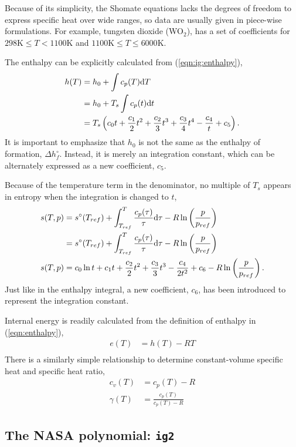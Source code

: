 Because of its simplicity, the Shomate equations lacks the degrees of freedom to express specific heat over wide ranges, so data are usually given in piece-wise formulations.  For example, tungsten dioxide (WO$_2$), has a set of coefficients for $298\mathrm{K} \le T < 1100\mathrm{K}$ and $1100\mathrm{K} \le T \le 6000\mathrm{K}$.

The enthalpy can be explicitly calculated from (\ref{eqn:ig:enthalpy}),
\begin{align}
h(T) &= h_0 + \int c_p(T) \mathrm{d} T \nonumber\\
 &= h_0 + T_s \int c_p(t) \mathrm{d} t \nonumber\\
 &= T_s \left(c_0 t + \frac{c_1}{2} t^2 + \frac{c_2}{3} t^3 + \frac{c_3}{4} t^4 - \frac{c_4}{t} + c_5 \right).
\end{align}
It is important to emphasize that $h_0$ is not the same as the enthalpy of formation, $\Delta h^\circ_f$.  Instead, it is merely an integration constant, which can be alternately expressed as a new coefficient, $c_5$.

Because of the temperature term in the denominator, no multiple of $T_s$ appears in entropy when the integration is changed to $t$,
\begin{align}
s(T,p) &= s^\circ(T_{ref}) + \int_{T_{ref}}^T \frac{c_p(\tau)}{\tau}\mathrm{d} \tau - R \ln \left( \frac{p}{p_{ref}} \right)\nonumber\\
 &= s^\circ(T_{ref}) + \int_{T_{ref}}^T \frac{c_p(\tau)}{\tau}\mathrm{d} \tau - R \ln \left( \frac{p}{p_{ref}} \right)\nonumber\\
s(T,p) &= c_0 \ln t + c_1 t + \frac{c_2}{2} t^2 + \frac{c_3}{3} t^3 -\frac{c_4}{2t^2} + c_6 - R \ln\left(\frac{p}{p_{ref}}\right).
\end{align}
Just like in the enthalpy integral, a new coefficient, $c_6$, has been introduced to represent the integration constant.

Internal energy is readily calculated from the definition of enthalpy in (\ref{eqn:enthalpy}),
\begin{align}
e(T) &= h(T) - RT\nonumber\\
\end{align}
There is a similarly simple relationship to determine constant-volume specific heat and specific heat ratio,
\begin{align}
c_v(T) &= c_p(T) - R\\
\gamma(T) &= \frac{c_p(T)}{c_p(T)-R}
\end{align}

\subsection{The NASA polynomial: \texttt{ig2}}


